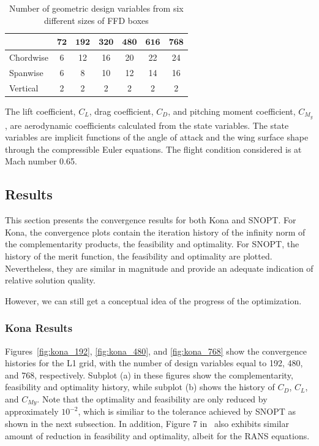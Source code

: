 \begin{table}[tbp]
  \begin{center}
    \caption{Number of geometric design variables from six different sizes of FFD boxes
    \label{tab:ffd_sizes}}
  \begin{tabular}{ l c c c c c c}
         & $\mathbf{72}$  & $\mathbf{192}$ & $\mathbf{320}$
    & $\mathbf{480}$  &  $\mathbf{616}$  &  $\mathbf{768}$   \\
    \hline
    Chordwise  &   6 & 12  & 16  & 20 & 22 & 24 \\ 
    Spanwise &   6 & 8 & 10  & 12 & 14 & 16 \\  
    Vertical  &   2 & 2 & 2 & 2  & 2 & 2
  \end{tabular}
  \end{center}
\end{table}

The lift coefficient, $C_L$, drag coefficient, $C_D$, and pitching moment coefficient, $C_{M_y}$, are aerodynamic coefficients calculated from the state variables. The state variables are implicit functions of the angle of attack and the wing surface shape through the compressible Euler equations.  The flight condition considered is at Mach number 0.65. 


\subsection{Results}
This section presents the convergence results for both Kona and SNOPT. For Kona, the convergence plots contain 
the iteration history of the infinity norm of the complementarity products, the feasibility and optimality. For SNOPT, 
the history of the merit function, the feasibility and optimality are plotted. Nevertheless, they are similar in magnitude and provide an adequate indication of relative solution quality.

However, we can still get a conceptual idea of the progress of the optimization.    
\subsubsection{Kona Results}
Figures~\ref{fig:kona_192}, \ref{fig:kona_480}, and \ref{fig:kona_768} show the convergence histories for the L1 grid, with the number of 
design variables equal to 192, 480, and 768, respectively. Subplot (a) in these 
figures show the complementarity, feasibility and optimality history, while subplot (b) shows the history of $C_D$, $C_L$, and $C_{My}$. Note that the 
optimality and feasibility are only reduced by approximately $10^{-2}$, 
which is similiar to the tolerance achieved by  
SNOPT as shown in the next subsection. In addition, Figure 7 in~\cite{2015lyu_crm} also exhibits similar amount of 
reduction in feasibility and optimality, albeit for the RANS equations.

